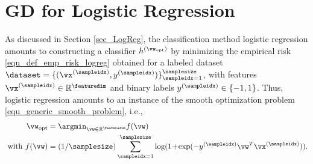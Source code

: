 \documentclass[12pt]{report}
\begin{document}
\section{GD for Logistic Regression}
\label{sec_GD_logistic_regression}

As discussed in Section \ref{sec_LogReg}, the classification method logistic regression amounts to 
constructing a classifier $h^{(\vw_{\rm opt})}$ by minimizing the empirical risk \eqref{equ_def_emp_risk_logreg} 
obtained for a labeled dataset $\dataset= \{ (\vx^{(\sampleidx)}, y^{(\sampleidx)}) \}_{\sampleidx=1}^{\samplesize}$, 
with features $\vx^{(\sampleidx)} \in \mathbb{R}^{\featuredim}$ and binary labels $y^{(\sampleidx)} \in \{-1,1\}$. 
Thus, logistic regression amounts to an instance of the smooth optimization problem \eqref{equ_generic_smooth_problem}, i.e., 
\begin{align} 
\label{equ_smooth_problem_logeg}
\vw_{\rm opt} & = \argmin_{\vw \in \mathbb{R}^{\featuredim}} f(\vw) \nonumber \\ 
 \mbox{ with } f(\vw) & = (1/\samplesize) \sum_{\sampleidx=1}^{\samplesize} \log( 1\!+\!\exp ( - y^{(\sampleidx)} \vw^{T} \vx^{(\sampleidx)})). 
\end{align} 
\end{document}
